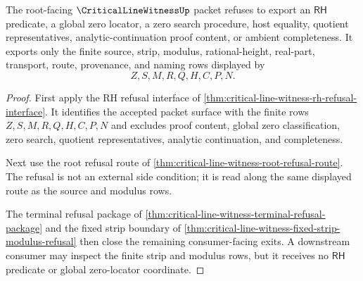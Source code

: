 \begin{theorem}
\label{thm:critical-line-witness-root-strip-refusal}
The root-facing $\CriticalLineWitnessUp$ packet refuses to export an $\mathsf{RH}$ predicate, a global zero locator, a zero search procedure, host equality, quotient representatives, analytic-continuation proof content, or ambient completeness. It exports only the finite source, strip, modulus, rational-height, real-part, transport, route, provenance, and naming rows displayed by
$$
Z,S,M,R,Q,H,C,P,N.
$$
\end{theorem}
\begin{proof}
First apply the RH refusal interface of \autoref{thm:critical-line-witness-rh-refusal-interface}. It identifies the accepted packet surface with the finite rows $Z,S,M,R,Q,H,C,P,N$ and excludes proof content, global zero classification, zero search, quotient representatives, analytic continuation, and completeness.

Next use the root refusal route of \autoref{thm:critical-line-witness-root-refusal-route}. The refusal is not an external side condition; it is read along the same displayed route as the source and modulus rows.

The terminal refusal package of \autoref{thm:critical-line-witness-terminal-refusal-package} and the fixed strip boundary of \autoref{thm:critical-line-witness-fixed-strip-modulus-refusal} then close the remaining consumer-facing exits. A downstream consumer may inspect the finite strip and modulus rows, but it receives no $\mathsf{RH}$ predicate or global zero-locator coordinate.
\end{proof}

